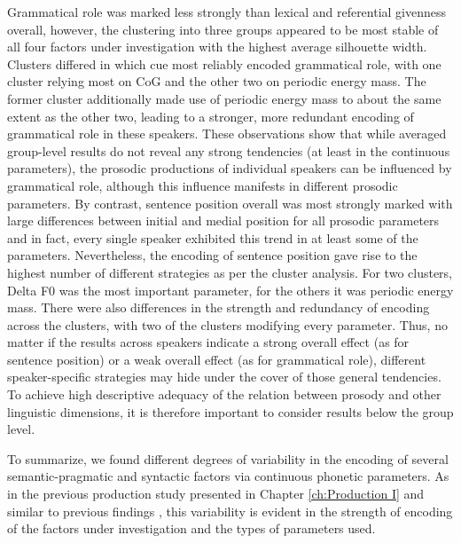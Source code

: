 Grammatical role was marked less strongly than lexical and referential givenness overall, however, the clustering into three groups appeared to be most stable of all four factors under investigation with the highest average silhouette width. Clusters differed in which cue most reliably encoded grammatical role, with one cluster relying most on CoG and the other two on periodic energy mass. The former cluster additionally made use of periodic energy mass to about the same extent as the other two, leading to a stronger, more redundant encoding of grammatical role in these speakers. These observations show that while averaged group-level results do not reveal any strong tendencies (at least in the continuous parameters), the prosodic productions of individual speakers can be influenced by grammatical role, although this influence manifests in different prosodic parameters. By contrast, sentence position overall was most strongly marked with large differences between initial and medial position for all prosodic parameters and in fact, every single speaker exhibited this trend in at least some of the parameters. Nevertheless, the encoding of sentence position gave rise to the highest number of different strategies as per the cluster analysis. For two clusters, Delta F0 was the most important parameter, for the others it was periodic energy mass. There were also differences in the strength and redundancy of encoding across the clusters, with two of the clusters modifying every parameter. Thus, no matter if the results across speakers indicate a strong overall effect (as for sentence position) or a weak overall effect (as for grammatical role), different speaker-specific strategies may hide under the cover of those general tendencies. To achieve high descriptive adequacy of the relation between prosody and other linguistic dimensions, it is therefore important to consider results below the group level.

To summarize, we found different degrees of variability in the encoding of several semantic-pragmatic and syntactic factors via continuous phonetic parameters. As in the previous production study presented in Chapter \ref{ch:Production I} and similar to previous findings \citep[e.g.,][]{cangemiListenerSpecificPerceptionSpeakerSpecific2015, ouyangIndividualDifferencesProsodic2015, severijnenYourVOORnaamNot2024}, this variability is evident in the strength of encoding of the factors under investigation and the types of parameters used.

